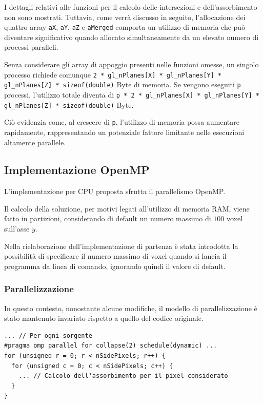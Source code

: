 \documentclass[12pt,a4paper]{report}
\begin{document}
I dettagli relativi alle funzioni per il calcolo delle intersezioni e dell'assorbimento non sono mostrati.
Tuttavia, come verrà discusso in seguito, l'allocazione dei quattro array \lstinline{aX}, \lstinline{aY}, \lstinline{aZ} e
\lstinline{aMerged} comporta un utilizzo di memoria che può diventare significativo quando allocato simultaneamente da un elevato
numero di processi paralleli.

Senza considerare gli array di appoggio presenti nelle funzioni omesse, un singolo processo richiede comunque
\lstinline{2 * gl_nPlanes[X] * gl_nPlanes[Y] * gl_nPlanes[Z] * sizeof(double)} Byte di memoria.
Se vengono eseguiti \lstinline{p} processi, l'utilizzo totale diventa di
\lstinline{p * 2 * gl_nPlanes[X] * gl_nPlanes[Y] * gl_nPlanes[Z] * sizeof(double)} Byte.

Ciò evidenzia come, al crescere di \lstinline{p}, l'utilizzo di memoria possa aumentare rapidamente, rappresentando un potenziale
fattore limitante nelle esecuzioni altamente parallele.

\subsection{Implementazione OpenMP}

L'implementazione per CPU proposta sfrutta il parallelismo OpenMP.

Il calcolo della soluzione, per motivi legati all'utilizzo di memoria RAM, viene fatto in partizioni, considerando di default un
numero massimo di \(100\) voxel sull'asse \(y\).

Nella rielaborazione dell'implementazione di partenza \cite{Colletta2024} è stata introdotta la possibilità di specificare il
numero massimo di voxel quando si lancia il programma da linea di comando, ignorando quindi il valore di default.

\subsubsection{Parallelizzazione}

In questo contesto, nonostante alcune modifiche, il modello di parallelizzazione è stato mantenuto invariato rispetto a quello del
codice originale.

\begin{lstlisting}[language=CStyle, caption={Codice C per il calcolo dell'assorbimento di un determinato pixel del rilevatore.}, label={lst:omp_D_point}]
... // Per ogni sorgente
#pragma omp parallel for collapse(2) schedule(dynamic) ...
for (unsigned r = 0; r < nSidePixels; r++) {
  for (unsigned c = 0; c < nSidePixels; c++) {
    ... // Calcolo dell'assorbimento per il pixel considerato
  }
}
\end{lstlisting}
\end{document}
